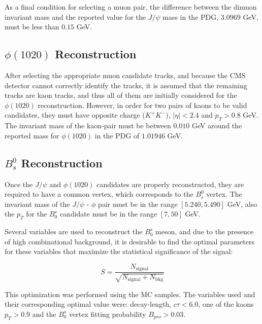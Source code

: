 As a final condition for selecting a muon pair, the difference between the dimuon invariant mass and the reported value for the $J/\psi$ mass in the PDG, $3.0969$ GeV, must be less than $0.15$ GeV. 
\subsection{$\phi(1020)$ Reconstruction}
After selecting the appropriate muon candidate tracks, and because the CMS detector cannot correctly identify the tracks, it is assumed that the remaining tracks are kaon tracks, and thus all of them are initially considered for the $\phi(1020)$ reconstruction. However, in order for two pairs of kaons to be valid candidates, they must have opposite charge ($K^{+}K^{-}$), $|\eta| < 2.4$ and $p_T > 0.8$ GeV. The invariant mass of the kaon-pair must be between $0.010$ GeV around the reported mass for $\phi(1020)$ in the PDG of $1.01946$ GeV.
\subsection{$B_s^0$ Reconstruction}
Once the $J/\psi$ and $\phi(1020)$ candidates are properly reconstructed, they are required to have a common vertex, which corresponds to the $B_s^0$ vertex. The invariant mass of the $J/\psi$ - $\phi$ pair must be in the range $[5.240, 5.490]$ GeV, also the $p_T$ for the $B_0^s$ candidate must be in the range $[7, 50]$ GeV. 

Several variables are used to reconstruct the $B_0^s$ meson, and due to the presence of high combinational background, it is desirable to find the optimal parameters for these variables that maximize the statistical significance of the signal:

\begin{equation}
	S = \frac{N_{\text{signal}}}{\sqrt{N_{\text{signal}} + N_{\text{bkg}}}}
\end{equation}

This optimization was performed using the MC samples. The variables used and their corresponding optimal value were: decay-length, $c\tau < 6.0 $, one of the kaons $p_T > 0.9$ and the $B_0^s$ vertex fitting probability $B_{pro} > 0.03$.